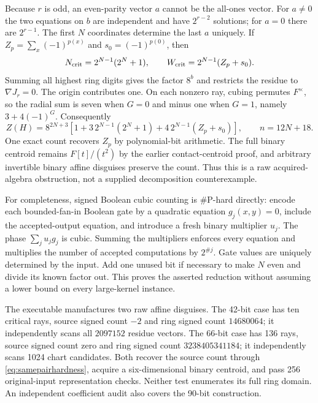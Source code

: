 Because $r$ is odd, an even-parity vector $a$ cannot be the all-ones
vector. For $a\ne0$ the two equations on $b$ are independent and have
$2^{r-2}$ solutions; for $a=0$ there are $2^{r-1}$. The first $N$
coordinates determine the last $a$ uniquely. If
$Z_p=\sum_x(-1)^{p(x)}$ and $s_0=(-1)^{p(0)}$, then
\[
 N_{\rm crit}=2^{N-1}(2^N+1),\qquad
 W_{\rm crit}=2^{N-1}(Z_p+s_0).
\]
Summing all highest ring digits gives the factor $8^b$ and restricts the
residue to $\nabla J_r=0$. The origin contributes one. On each nonzero
ray, cubing permutes $F^\times$, so the radial sum is seven when $G=0$
and minus one when $G=1$, namely $3+4(-1)^G$. Consequently
\begin{equation}\label{eq:samepairhardness}
 Z(H)=8^{2N+3}
 \left[1+3\,2^{N-1}(2^N+1)
       +4\,2^{N-1}(Z_p+s_0)\right],
 \qquad n=12N+18.
\end{equation}
One exact count recovers $Z_p$ by polynomial-bit arithmetic. The full
binary centroid remains $F[t]/(t^2)$ by the earlier contact-centroid
proof, and arbitrary invertible binary affine disguises preserve the
count. Thus this is a raw acquired-algebra obstruction, not a supplied
decomposition counterexample.

For completeness, signed Boolean cubic counting is \#P-hard directly:
encode each bounded-fan-in Boolean gate by a quadratic equation
$g_j(x,y)=0$, include the accepted-output equation, and introduce a
fresh binary multiplier $u_j$. The phase $\sum_j u_jg_j$ is cubic.
Summing the multipliers enforces every equation and multiplies the
number of accepted computations by $2^{\#j}$. Gate values are uniquely
determined by the input. Add one unused bit if necessary to make $N$
even and divide its known factor out. This proves the asserted reduction
without assuming a lower bound on every large-kernel instance.

The executable manufactures two raw affine disguises. The 42-bit case
has ten critical rays, source signed count $-2$ and ring signed count
$14680064$; it independently scans all $2097152$ residue vectors.
The 66-bit case has 136 rays, source signed count zero and ring signed
count $3238405341184$; it independently scans 1024 chart candidates.
Both recover the source count through \eqref{eq:samepairhardness},
acquire a six-dimensional binary centroid, and pass 256 original-input
representation checks. Neither test enumerates its full ring domain.
An independent coefficient audit also covers the 90-bit construction.

